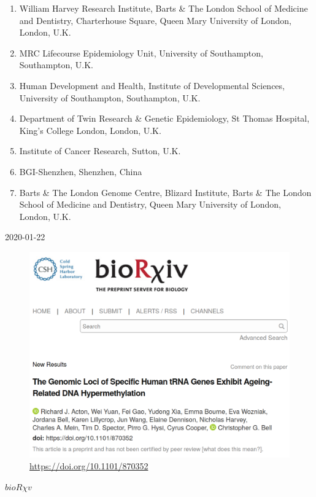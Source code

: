 \documentclass[]{book}
\providecommand{\tightlist}{%
  \setlength{\itemsep}{0pt}\setlength{\parskip}{0pt}}
\begin{document}
\begin{enumerate}
\def\labelenumi{\arabic{enumi}.}
\tightlist
\item
  William Harvey Research Institute, Barts \& The London School of Medicine and Dentistry, Charterhouse Square, Queen Mary University of London, London, U.K.
\item
  MRC Lifecourse Epidemiology Unit, University of Southampton, Southampton, U.K.
\item
  Human Development and Health, Institute of Developmental Sciences, University of Southampton, Southampton, U.K.\\
\item
  Department of Twin Research \& Genetic Epidemiology, St Thomas Hospital, King's College London, London, U.K.
\item
  Institute of Cancer Research, Sutton, U.K.
\item
  BGI-Shenzhen, Shenzhen, China
\item
  Barts \& The London Genome Centre, Blizard Institute, Barts \& The London School of Medicine and Dentistry, Queen Mary University of London, London, U.K.
\end{enumerate}

2020-01-22

\begin{figure}
\centering
\includegraphics{figs/biorxiv_screenshot.png}
\caption{\url{https://doi.org/10.1101/870352}}
\end{figure}

\href{https://doi.org/10.1101/870352}{\(bioR \chi v\)} \citep{Acton2020}
\end{document}
